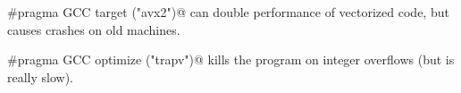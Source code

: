 		\verb@#pragma GCC target ("avx2")@ can double performance of vectorized code, but causes crashes on old machines.
		
		\verb@#pragma GCC optimize ("trapv")@ kills the program on integer overflows (but is really slow).
	
